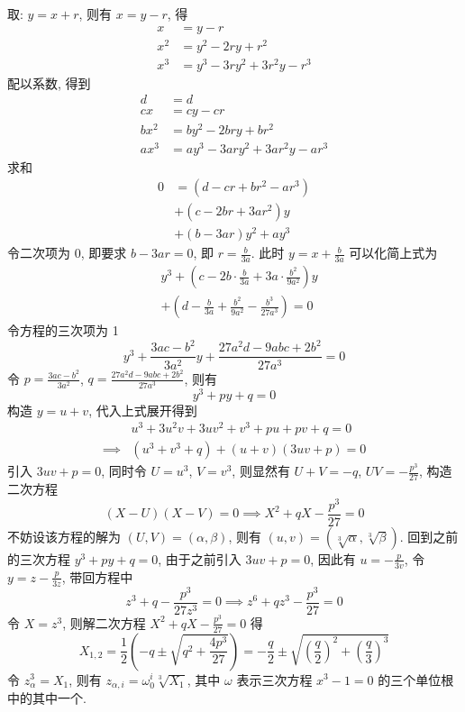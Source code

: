 \begin{solution}
取: $y = x + r$, 则有 $x = y - r$, 得
\[ \begin{aligned}
x &= y - r \\
x^2 &= y^2 - 2ry + r^2 \\
x^3 &= y^3 - 3ry^2 + 3r^2y - r^3
\end{aligned} \]
配以系数, 得到
\[ \begin{aligned}
d &= d \\
cx &= cy - cr \\
bx^2 &= by^2 - 2bry + br^2 \\
ax^3 &= ay^3 - 3ary^2 + 3ar^2y - ar^3
\end{aligned} \]
求和
\[ \begin{aligned}
0 &= (d - cr + br^2 - ar^3) \\
    &+ (c - 2br + 3ar^2) y \\
    &+ (b - 3ar) y^2 + ay^3
\end{aligned} \]
令二次项为 0, 即要求 $b - 3ar = 0$, 即 $r = \frac{b}{3a}$. 此时
$y = x + \frac{b}{3a}$ 可以化简上式为
\[ \begin{aligned}
&y^3 + (c - 2b \cdot \frac{b}{3a} + 3a \cdot \frac{b^2}{9a^2}) y \\
&+ (d - \frac{b}{3a} + \frac{b^2}{9a^2} - \frac{b^3}{27a^3}) = 0
\end{aligned} \]
令方程的三次项为 1
\[ y^3 + \frac{3ac-b^2}{3a^2} y + \frac{27a^2d - 9abc + 2b^2}{27a^3} = 0 \]
令 $p = \frac{3ac-b^2}{3a^2}$, $q = \frac{27a^2d - 9abc + 2b^2}{27a^3}$, 则有
\[ y^3 + p y + q = 0 \]
构造 $y = u + v$, 代入上式展开得到
\[ \begin{aligned}
& u^3 + 3u^2v + 3uv^2 + v^3 + pu + pv + q = 0 \\
\implies & (u^3 + v^3 + q) + (u + v)(3uv + p) = 0
\end{aligned} \]
引入 $3uv + p = 0$, 同时令 $U = u^3$, $V = v^3$, 则显然有 $U + V = -q$,
$UV = -\frac{p^3}{27}$, 构造二次方程
\[ (X - U)(X - V) = 0 \implies X^2 + qX - \frac{p^3}{27} = 0 \]
不妨设该方程的解为 $(U, V) = (\alpha, \beta)$, 则有
$(u, v) = (\sqrt[3]{\alpha}, \sqrt[3]{\beta})$. 回到之前的三次方程
$y^3 + py + q = 0$, 由于之前引入 $3uv + p = 0$, 因此有 $u = -\frac{p}{3v}$, 令
$y = z - \frac{p}{3z}$, 带回方程中
\[ z^3 + q - \frac{p^3}{27z^3} = 0 \implies z^6 + qz^3 - \frac{p^3}{27} = 0 \]
令 $X = z^3$, 则解二次方程 $X^2 + qX - \frac{p^3}{27} = 0$ 得
\[
X_{1, 2} = \frac12 (-q \pm \sqrt{q^2 + \frac{4p^3}{27}})
    = -\frac{q}{2} \pm \sqrt{(\frac{q}{2})^2 + (\frac{q}{3})^3}
\]
令 $z_\alpha^3 = X_1$, 则有 $z_{\alpha, i} = \omega^i_0 \sqrt[3]{X_1}$, 其中
$\omega$ 表示三次方程 $x^3-1 = 0$ 的三个单位根中的其中一个.


\end{solution}
